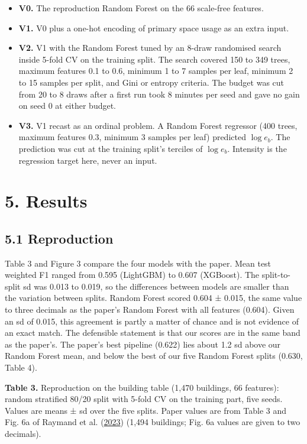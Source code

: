 \documentclass[
  10pt,
]{article}
\providecommand{\tightlist}{%
  \setlength{\itemsep}{0pt}\setlength{\parskip}{0pt}}
\begin{document}
\begin{itemize}
\tightlist
\item
  \textbf{V0.} The reproduction Random Forest on the 66 scale-free
  features.
\item
  \textbf{V1.} V0 plus a one-hot encoding of primary space usage as an
  extra input.
\item
  \textbf{V2.} V1 with the Random Forest tuned by an 8-draw randomised
  search inside 5-fold CV on the training split. The search covered 150
  to 349 trees, maximum features 0.1 to 0.6, minimum 1 to 7 samples per
  leaf, minimum 2 to 15 samples per split, and Gini or entropy criteria.
  The budget was cut from 20 to 8 draws after a first run took 8 minutes
  per seed and gave no gain on seed 0 at either budget.
\item
  \textbf{V3.} V1 recast as an ordinal problem. A Random Forest
  regressor (400 trees, maximum features 0.3, minimum 3 samples per
  leaf) predicted \(\log e_b\). The prediction was cut at the training
  split's terciles of \(\log e_b\). Intensity is the regression target
  here, never an input.
\end{itemize}

\hypertarget{results}{%
\section{5. Results}\label{results}}

\hypertarget{reproduction}{%
\subsection{5.1 Reproduction}\label{reproduction}}

Table 3 and Figure 3 compare the four models with the paper. Mean test
weighted F1 ranged from 0.595 (LightGBM) to 0.607 (XGBoost). The
split-to-split sd was 0.013 to 0.019, so the differences between models
are smaller than the variation between splits. Random Forest scored
0.604 ± 0.015, the same value to three decimals as the paper's Random
Forest with all features (0.604). Given an sd of 0.015, this agreement
is partly a matter of chance and is not evidence of an exact match. The
defensible statement is that our scores are in the same band as the
paper's. The paper's best pipeline (0.622) lies about 1.2 sd above our
Random Forest mean, and below the best of our five Random Forest splits
(0.630, Table 4).

\textbf{Table 3.} Reproduction on the building table (1,470 buildings,
66 features): random stratified 80/20 split with 5-fold CV on the
training part, five seeds. Values are means ± sd over the five splits.
Paper values are from Table 3 and Fig. 6a of Raymand et al.
(\protect\hyperlink{ref-raymand2023}{2023}) (1,494 buildings; Fig. 6a
values are given to two decimals).
\end{document}

